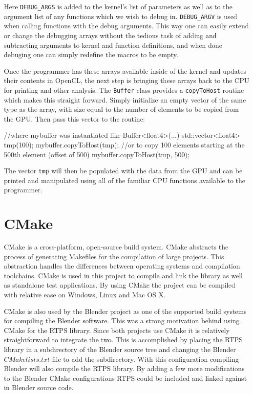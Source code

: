 Here \verb|DEBUG_ARGS| is added to the kernel's list of parameters as well as
to the argument list of any functions which we wish to debug in.
\verb|DEBUG_ARGV| is used when calling functions with the debug arguments. This
way one can easily extend or change the debugging arrays without the tedious
task of adding and subtracting arguments to kernel and function definitions,
and when done debuging one can simply redefine the macros to be empty.

Once the programmer has these arrays available inside of the kernel and updates
their contents in OpenCL, the next step is bringing these arrays back to the
CPU for printing and other analysis. The \verb|Buffer| class provides a
\verb|copyToHost| routine which makes this straight forward. Simply initialize
an empty vector of the same type as the array, with size equal to the
number of elements to be copied from the GPU. Then pass this vector to the routine:
\begin{cppcode}{0}
//where mybuffer was instantiated like Buffer<float4>(...)
std::vector<float4> tmp(100);
mybuffer.copyToHost(tmp);
//or to copy 100 elements starting at the 500th element (offset of 500)
mybuffer.copyToHost(tmp, 500);
\end{cppcode}

The vector \verb|tmp| will then be populated with the data from the GPU and can
be printed and manipulated using all of the familiar CPU functions available to
the programmer. 

\section{CMake}
CMake is a cross-platform, open-source build system.\cite{CMake} CMake
abstracts the process of generating Makefiles for the compilation of large
projects. This abstraction handles the differences between operating systems
and compilation toolchains. CMake is used in this project to compile and link
the library as well as standalone test applications. By using CMake the project
can be compiled with relative ease on Windows, Linux and Mac OS X.


CMake is also used by the Blender project as one of the supported build systems
for compiling the Blender software. This was a strong motivation behind using
CMake for the RTPS library. Since both projects use CMake it is relatively
straightforward to integrate the two. This is accomplished by placing the RTPS
library in a subdirectory of the Blender source tree and changing the Blender
$CMakelists.txt$ file to add the subdirectory. With this configuration
compiling Blender will also compile the RTPS library. By adding a few more
modifications to the Blender CMake configurations RTPS could be included and
linked against in Blender source code.



